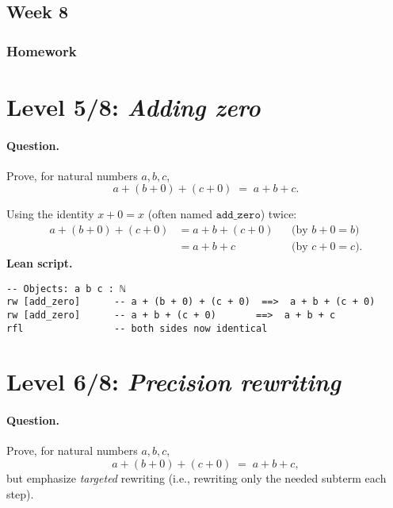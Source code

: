 \documentclass{article}
\theoremstyle{theorem}
\theoremstyle{definition}
\theoremstyle{remark}
\begin{document}
\subsection{Week 8}

\subsubsection{Homework}

\section*{Level 5/8: \textit{Adding zero}}

\paragraph{Question.}
Prove, for natural numbers \(a,b,c\),
\[
a + (b + 0) + (c + 0) \;=\; a + b + c.
\]

\begin{solution}
Using the identity \(x + 0 = x\) (often named \(\texttt{add\_zero}\)) twice:
\[
\begin{aligned}
a + (b + 0) + (c + 0)
&= a + b + (c + 0) &&\text{(by } b+0=b\text{)}\\
&= a + b + c       &&\text{(by } c+0=c\text{).}
\end{aligned}
\]
\medskip
\noindent\textbf{Lean script.}
\begin{lstlisting}
-- Objects: a b c : ℕ
rw [add_zero]      -- a + (b + 0) + (c + 0)  ==>  a + b + (c + 0)
rw [add_zero]      -- a + b + (c + 0)       ==>  a + b + c
rfl                -- both sides now identical
\end{lstlisting}
\end{solution}

\bigskip

\section*{Level 6/8: \textit{Precision rewriting}}

\paragraph{Question.}
Prove, for natural numbers \(a,b,c\),
\[
a + (b + 0) + (c + 0) \;=\; a + b + c,
\]
but emphasize \emph{targeted} rewriting (i.e., rewriting only the needed subterm each step).
\end{document}

